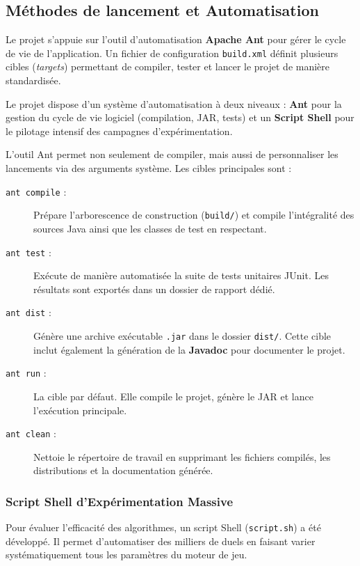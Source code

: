 \documentclass[11pt,a4paper]{article}
\begin{document}
\subsection{Méthodes de lancement et Automatisation}
Le projet s'appuie sur l'outil d'automatisation \textbf{Apache Ant} pour gérer le cycle de vie de l'application. Un fichier de configuration \texttt{build.xml} définit plusieurs cibles (\textit{targets}) permettant de compiler, tester et lancer le projet de manière standardisée.

Le projet dispose d'un système d'automatisation à deux niveaux : \textbf{Ant} pour la gestion du cycle de vie logiciel (compilation, JAR, tests) et un \textbf{Script Shell} pour le pilotage intensif des campagnes d'expérimentation.

L'outil Ant permet non seulement de compiler, mais aussi de personnaliser les lancements via des arguments système. Les cibles principales sont :


\begin{description}
    \item[\texttt{ant compile} :] Prépare l'arborescence de construction (\texttt{build/}) et compile l'intégralité des sources Java ainsi que les classes de test en respectant.
    
    \item[\texttt{ant test} :] Exécute de manière automatisée la suite de tests unitaires JUnit. Les résultats sont exportés dans un dossier de rapport dédié.
    
    \item[\texttt{ant dist} :] Génère une archive exécutable \texttt{.jar} dans le dossier \texttt{dist/}. Cette cible inclut également la génération de la \textbf{Javadoc} pour documenter le projet.
    
    \item[\texttt{ant run} :] La cible par défaut. Elle compile le projet, génère le JAR et lance l'exécution principale.
    
    \item[\texttt{ant clean} :] Nettoie le répertoire de travail en supprimant les fichiers compilés, les distributions et la documentation générée.
\end{description}

\subsubsection{Script Shell d'Expérimentation Massive}

Pour évaluer l'efficacité des algorithmes, un script Shell (\texttt{script.sh}) a été développé. Il permet d'automatiser des milliers de duels en faisant varier systématiquement tous les paramètres du moteur de jeu.
\end{document}
